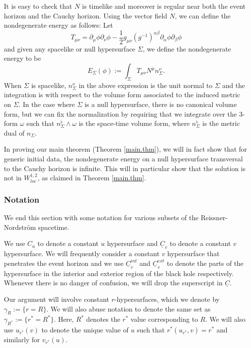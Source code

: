 \documentclass[12 pt, reqno]{amsart}
\theoremstyle{definition}
\theoremstyle{remark}
\numberwithin{equation}{section}
\newcommand{\rd}{\partial}
\newcommand{\0}{\emptyset}
\newcommand{\alp}{\alpha}
\newcommand{\Sgm}{\Sigma}
\newcommand{\f}{\frac}
\begin{document}
It is easy to check that $N$ is timelike and moreover is regular near both the event horizon and the Cauchy horizon. Using the vector field $N$, we can define the nondegenerate energy as follows:
Let 
$$T_{\mu\nu}=\rd_\mu\phi\rd_\nu\phi - \f12 g_{\mu\nu}(g^{-1})^{\alp\beta}\rd_\alp\phi\rd_{\beta}\phi$$
and given any spacelike or null hypersurface $\Sigma$, we define the nondegenerate energy to be
$$E_{\Sigma}(\phi):=\int_{\Sigma} T_{\mu\nu} N^\mu n^{\nu}_\Sigma.$$
When $\Sigma$ is spacelike, $n^{\nu}_\Sigma$ in the above expression is the unit normal to $\Sigma$ and the integration is with respect to the volume form associated to the induced metric on $\Sigma$. In the case where $\Sigma$ is a null hypersurface, there is no canonical volume form, but we can fix the normalization by requiring that we integrate over the $3$-form $\omega$ such that 
$n_{\Sigma}^{\flat} \wedge \omega$ is the space-time volume form, where $n_{\Sgm}^{\flat}$ is the metric dual of $n_{\Sgm}$.

In proving our main theorem (Theorem \ref{main.thm}), we will in fact show that for generic initial data, the nondegenerate energy on a null hypersurface transversal to the Cauchy horizon is infinite. This will in particular show that the solution is not in $W^{1,2}_{loc}$, as claimed in Theorem \ref{main.thm}.

\subsubsection{Notation}\label{sec.notation}
We end this section with some notation for various subsets of the Reissner-Nordstr\"om spacetime. 

We use $C_u$ to denote a constant $u$ hypersurface and $\underline C_v$ to denote a constant $v$ hypersurface. We will frequently consider a constant $v$ hypersurface that penetrates the event horizon and we use $\underline C^{int}_v$ and $\underline C^{ext}_v$ to denote the parts of the hypersurface in the interior and exterior region of the black hole respectively. Whenever there is no danger of confusion, we will drop the superscript in $\underline C$.

Our argument will involve constant $r$-hypersurfaces, which we denote by $\gamma_R:=\{r=R\}$. We will also abuse notation to denote the same set as $\gamma_{R^{\ast}}:=\{r^{\ast}=R^{\ast}\}$. Here, $R^{\ast}$ denotes the $r^{\ast}$ value corresponding to $R$. We will also use $u_{r^{\ast}}(v)$ to denote the unique value of $u$ such that $r^{\ast}(u_{r^{\ast}},v)=r^{\ast}$ and similarly for $v_{r^{\ast}}(u)$.
\end{document}
